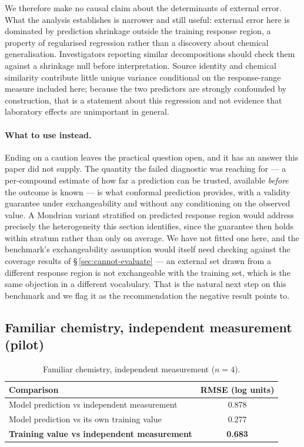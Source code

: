 \documentclass[11pt,a4paper]{article}
\begin{document}
We therefore make no causal claim about the determinants of external error. What the
analysis establishes is narrower and still useful: external error here is dominated
by prediction shrinkage outside the training response region, a property of
regularised regression rather than a discovery about chemical generalisation.
Investigators reporting similar decompositions should check them against a shrinkage
null before interpretation. Source identity and chemical similarity contribute little
unique variance conditional on the response-range measure included here; because the two
predictors are strongly confounded by construction, that is a statement about this
regression and not evidence that laboratory effects are unimportant in general.

\paragraph{What to use instead.} Ending on a caution leaves the practical question open,
and it has an answer this paper did not supply. The quantity the failed diagnostic was
reaching for --- a per-compound estimate of how far a prediction can be trusted, available
\emph{before} the outcome is known --- is what conformal prediction provides, with a
validity guarantee under exchangeability and without any conditioning on the observed
value.\cite{Norinder2014} A Mondrian variant stratified on predicted response region
would address precisely the heterogeneity this section identifies, since the guarantee
then holds within stratum rather than only on average. We have not fitted one here, and
the benchmark's exchangeability assumption would itself need checking against the coverage
results of \S\,\ref{sec:cannot-evaluate} --- an external set drawn from a different
response region is not exchangeable with the training set, which is the same objection in
a different vocabulary. That is the natural next step on this benchmark and we flag it as
the recommendation the negative result points to.

\subsection{Familiar chemistry, independent measurement (pilot)}
\label{sec:pilot}

\begin{table}[htbp]
\centering
\small
\caption{Familiar chemistry, independent measurement ($n=4$).}
\label{tab:familiar}
\begin{tabular}{lc}
\toprule
Comparison & RMSE (log units) \\
\midrule
Model prediction vs independent measurement & 0.878 \\
Model prediction vs its own training value  & 0.277 \\
\textbf{Training value vs independent measurement} & \textbf{0.683} \\
\bottomrule
\end{tabular}
\end{table}
\end{document}
